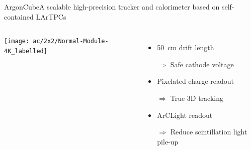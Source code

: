 \documentclass[]{beamer}
\newcommand*{\emphcol}{blue}
\newcommand*{\AC}{{ArgonCube}}
\newcommand*{\AL}{{ArCLight}}
\newcommand*{\lartpc}{{LArTPC}}
\begin{document}
\begin{frame}{\AC{}}{\color{\emphcol}A scalable high-precision tracker and calorimeter based on self-contained \lartpc{}s}
	\begin{columns}[c]
		\centering
		\texttt{[image: ac/2x2/Normal-Module-4K\_labelled]}
		\begin{itemize}
			\item \SI{50}{\centi\metre} drift length
			\item[$\Rightarrow$] {\color{\emphcol} Safe cathode voltage}
			\item Pixelated charge readout
			\item[$\Rightarrow$] {\color{\emphcol} True 3D tracking}
			\item \AL{} readout
			\item[$\Rightarrow$] {\color{\emphcol} Reduce scintillation light pile-up}
		\end{itemize}
	\end{columns}
\end{frame}
\end{document}
